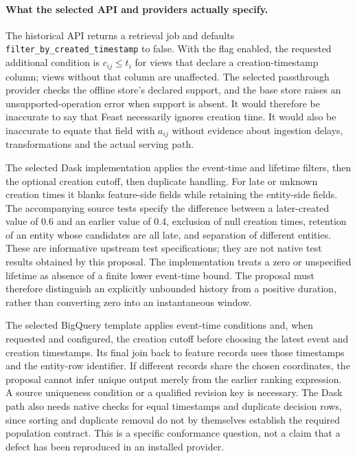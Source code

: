\paragraph{What the selected API and providers actually specify.}
The historical API returns a retrieval job and defaults
\texttt{filter\_by\_created\_timestamp} to false. With the flag enabled,
the requested additional condition is $c_{ij}\leq t_i$ for views that declare
a creation-timestamp column; views without that column are unaffected. The
selected passthrough provider checks the offline store's declared support,
and the base store raises an unsupported-operation error when support is
absent. It would therefore be inaccurate to say that Feast necessarily
ignores creation time. It would also be inaccurate to equate that field with
$a_{ij}$ without evidence about ingestion delays, transformations and the
actual serving path.\citep{exec19_feast_source}

The selected Dask implementation applies the event-time and lifetime filters,
then the optional creation cutoff, then duplicate handling. For late or
unknown creation times it blanks feature-side fields while retaining the
entity-side fields. The accompanying source tests specify the difference
between a later-created value of $0.6$ and an earlier value of $0.4$, exclusion
of null creation times, retention of an entity whose candidates are all late,
and separation of different entities. These are informative upstream test
specifications; they are not native test results obtained by this proposal.
The implementation treats a zero or unspecified lifetime as absence of a
finite lower event-time bound. The proposal must therefore distinguish an
explicitly unbounded history from a positive duration, rather than converting
zero into an instantaneous window.\citep{exec19_feast_source}

The selected BigQuery template applies event-time conditions and, when
requested and configured, the creation cutoff before choosing the latest
event and creation timestamps. Its final join back to feature records uses
those timestamps and the entity-row identifier. If different records share
the chosen coordinates, the proposal cannot infer unique output merely from
the earlier ranking expression. A source uniqueness condition or a qualified
revision key is necessary. The Dask path also needs native checks for equal
timestamps and duplicate decision rows, since sorting and duplicate removal
do not by themselves establish the required population contract. This is a
specific conformance question, not a claim that a defect has been reproduced
in an installed provider.\citep{exec19_feast_source}

